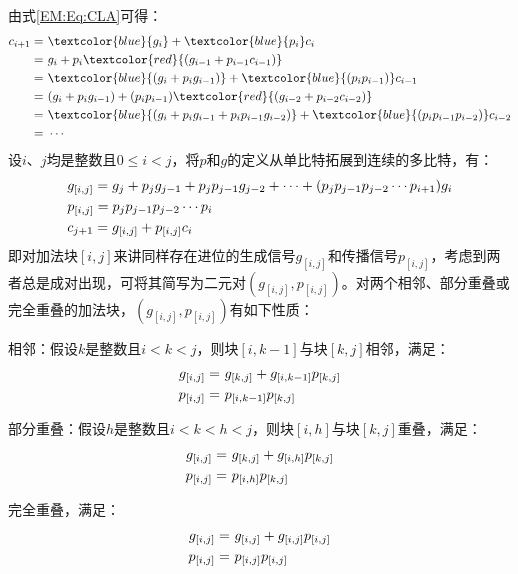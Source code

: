 由式\eqref{EM:Eq:CLA}可得：
\begin{align}
    c_{i+1} = & \ \textcolor{blue}{g_i} +\textcolor{blue}{p_i} c_i \notag \\
          = & \ g_i + p_i \textcolor{red}{(g_{i-1} + p_{i-1} c_{i-1})} \notag \\
          = & \ \textcolor{blue}{(g_i + p_i g_{i-1})} + \textcolor{blue}{(p_i p_{i-1})} c_{i-1} \notag \\
          = & \ (g_i + p_i g_{i-1}) + (p_i p_{i-1}) \textcolor{red}{(g_{i-2} + p_{i-2} c_{i-2})} \notag \\
          = & \ \textcolor{blue}{(g_i + p_i g_{i-1} + p_i p_{i-1} g_{i-2})} + \textcolor{blue}{(p_i p_{i-1} p_{i-2})} c_{i-2} \notag \\
          = & \ \cdots
\label{EM:Eq:PPA_CLA}
\end{align}
设$i$、$j$均是整数且$0 \le i < j$，将$p$和$g$的定义从单比特拓展到连续的多比特，有：
\begin{align}
    & g_{[i,j]} =  g_j + p_j g_{j-1} + p_j p_{j-1} g_{j-2} + \cdots + (p_j p_{j-1} p_{j-2} \cdots p_{i+1}) g_i \notag \\
    & p_{[i,j]} = p_j p_{j-1} p_{j-2} \cdots p_i \notag \\
    & c_{j+1} = g_{[i,j]} + p_{[i,j]} c_i
\label{PPA_multi_bit_gp}
\end{align}
即对加法块$[i,j]$来讲同样存在进位的生成信号$g_{[i,j]}$和传播信号$p_{[i,j]}$，考虑到两者总是成对出现，可将其简写为二元对$(g_{[i,j]},p_{[i,j]})$。对两个相邻、部分重叠或完全重叠的加法块，$(g_{[i,j]},p_{[i,j]})$有如下性质：

相邻：假设$k$是整数且$i<k<j$，则块$[i,k-1]$与块$[k,j]$相邻，满足：
\begin{align}
    g_{[i,j]} = & \ g_{[k,j]} + g_{[i,k-1]} p_{[k,j]} \notag \\
    p_{[i,j]} = & \ p_{[i,k-1]} p_{[k,j]}
\label{EM:Eq:PPA_相邻}
\end{align}

部分重叠：假设$h$是整数且$i<k<h<j$，则块$[i,h]$与块$[k,j]$重叠，满足：
\begin{align}
    g_{[i,j]} = & \ g_{[k,j]} + g_{[i,h]} p_{[k,j]} \notag \\
    p_{[i,j]} = & \ p_{[i,h]} p_{[k,j]}
    \label{EM:Eq:PPA_部分重叠}
\end{align}

完全重叠，满足：
\begin{align}
    g_{[i,j]} = & \ g_{[i,j]} + g_{[i,j]} p_{[i,j]} \notag \\
    p_{[i,j]} = & \ p_{[i,j]} p_{[i,j]}
    \label{EM:Eq:PPA_完全重叠}
\end{align}

